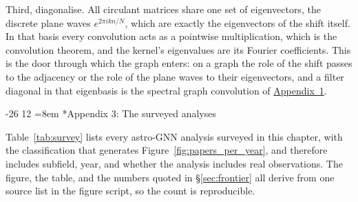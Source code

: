 \documentclass[graybox, envcountchap]{Template/svmult}
\makeatletter
\newif\ifarxiv
\newcommand{\chapterorreview}{\ifarxiv review\else chapter\fi}%
\renewcommand\section{\@startsection{section}{1}{\z@}%
                       {-26\p@}%
                       {12\p@}%
                       {\normalfont\secsize\secstyle
                        \rightskip=\z@ \@plus 8em\pretolerance=10000 }}
\newcommand{\printreferences}{\clearpage}
\makeatother
\begin{document}
Third, diagonalise. All circulant matrices share one set of eigenvectors, the discrete plane waves $e^{2\pi i kn/N}$, which are exactly the eigenvectors of the shift itself. In that basis every convolution acts as a pointwise multiplication, which is the convolution theorem, and the kernel's eigenvalues are its Fourier coefficients. This is the door through which the graph enters: on a graph the role of the shift passes to the adjacency or the role of the plane waves to their eigenvectors, and a filter diagonal in that eigenbasis is the spectral graph convolution of \hyperref[app:sym:scale]{Appendix~1}.

\section*{Appendix 3: The surveyed analyses}
\label{app:survey}

Table~\ref{tab:survey} lists every astro-GNN analysis surveyed in this \chapterorreview{}, with the classification that generates Figure~\ref{fig:papers_per_year}, and therefore includes subfield, year, and whether the analysis includes real observations. The figure, the table, and the numbers quoted in \S\ref{sec:frontier} all derive from one source list in the figure script, so the count is reproducible.



\ifarxiv\else\printreferences\fi%



\end{document}
